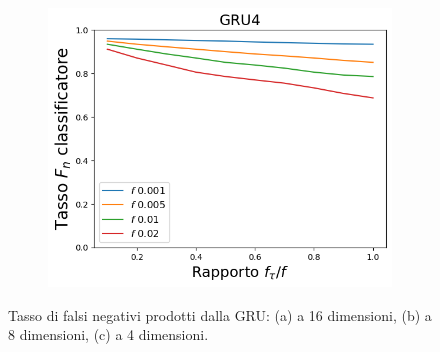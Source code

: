 \documentclass[../../main.tex]{subfiles}
\begin{document}
\begin{figure}[H]
\begin{subfigure}[b]{0.49\textwidth}
            \label{fig:LBFFNR_GRU8}
        \end{subfigure}
        \begin{subfigure}[b]{0.49\textwidth}
            \centering
            \includegraphics[width = \textwidth]{immagini/7/LBF/GRU4_FNR.png}
            \caption{}
            \label{fig:LBFFNR_GRU4}
        \end{subfigure}
        \caption{Tasso di falsi negativi prodotti dalla GRU: (a) a 16 dimensioni, (b) a 8 dimensioni, (c) a 4 dimensioni.}
        \label{fig:GRU_LBFFNR}
    \end{figure}
\end{document}
